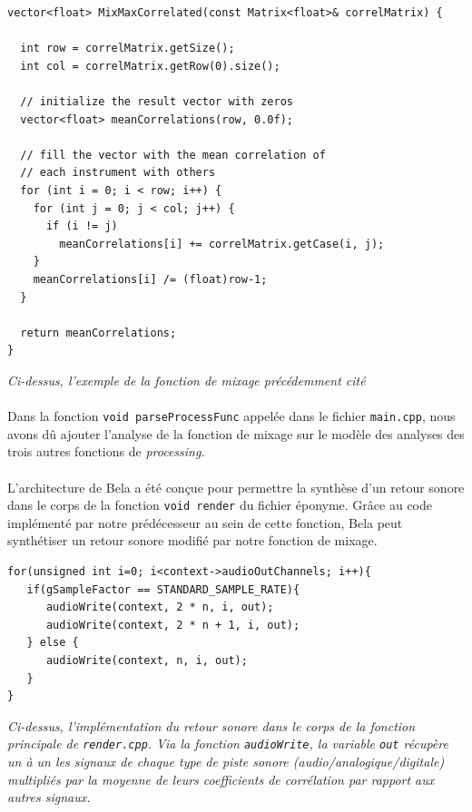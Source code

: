 \begin{lstlisting}
vector<float> MixMaxCorrelated(const Matrix<float>& correlMatrix) {

  int row = correlMatrix.getSize();
  int col = correlMatrix.getRow(0).size();

  // initialize the result vector with zeros
  vector<float> meanCorrelations(row, 0.0f);

  // fill the vector with the mean correlation of
  // each instrument with others
  for (int i = 0; i < row; i++) {
    for (int j = 0; j < col; j++) {
      if (i != j)
        meanCorrelations[i] += correlMatrix.getCase(i, j);
    }
    meanCorrelations[i] /= (float)row-1;
  }

  return meanCorrelations;
}
\end{lstlisting}

\begin{center}
 \textit{Ci-dessus, l'exemple de la fonction de mixage précédemment cité}
\end{center}

\paragraph{}
Dans la fonction \verb!void parseProcessFunc!  appelée dans le fichier
\verb!main.cpp!, nous avons dû ajouter l'analyse de la fonction de
mixage sur le modèle des analyses des trois autres fonctions de
\textit{processing}.

\paragraph{}
L'architecture de Bela a été conçue pour permettre la synthèse d'un
retour sonore dans le corps de la fonction \verb!void render! du
fichier éponyme. Grâce au code implémenté par notre prédécesseur au
sein de cette fonction, Bela peut synthétiser un retour sonore modifié
par notre fonction de mixage.

\begin{lstlisting}
for(unsigned int i=0; i<context->audioOutChannels; i++){
   if(gSampleFactor == STANDARD_SAMPLE_RATE){
      audioWrite(context, 2 * n, i, out);
      audioWrite(context, 2 * n + 1, i, out);
   } else {
      audioWrite(context, n, i, out);
   }
}
\end{lstlisting}

\begin{center} \textit{Ci-dessus, l'implémentation du retour sonore
  dans le corps de la fonction principale de \verb!render.cpp!. Via la
  fonction \verb!audioWrite!, la variable \verb!out! récupère un à un
  les signaux de chaque type de piste sonore
  (audio/analogique/digitale) multipliés par la moyenne de leurs
  coefficients de corrélation par rapport aux autres
  signaux.} \end{center}

